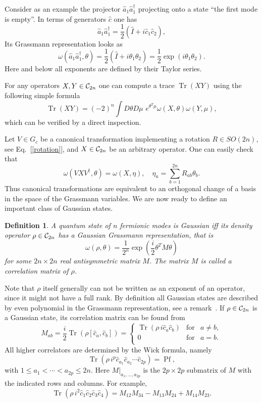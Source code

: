 \documentclass[twocolumn,showpacs,preprintnumbers,superscriptaddress]{revtex4}
\newtheorem{dfn}{Definition}
\newcommand{\Clif}{{\cal C}}
\newcommand{\be}{\begin{equation}}
\newcommand{\ee}{\end{equation}}
\newcommand{\ba}{\begin{array}}
\newcommand{\ea}{\end{array}}
\newcommand{\Pf}[1]{\mathop{\mathrm{Pf}(#1)}}
\newcommand{\aop}{{\hat{a}}}
\newcommand{\cop}{{\hat{c}}}
\newcommand{\Iop}{{\hat{I}}}
\DeclareMathOperator*{\tr}{\mathop{\mathrm{Tr}}}
\begin{document}
Consider as an example the projector $\aop_1 \aop_1^\dag$
projecting onto a state ``the first mode is empty''. In terms
of generators $\cop$ one has
\[
\aop_1 \aop_1^\dag = \frac12\left( \Iop + i\cop_1\cop_2\right),
\]
Its Grassmann representation looks as
\be\label{Grassmann_Proj}
\omega(\aop_1 \aop_1^\dag,\theta)=
\frac12\left( \Iop + i\theta_1\theta_2\right) =
\frac12 \exp{ \left(  i \theta_1\theta_2 \right) }.
\ee
Here and below all exponents are defined by their Taylor series.

For any operators $X,Y\in \Clif_{2n}$  one can compute a trace
$\tr(XY)$ using the following simple formula
\be\label{trace}
\tr(X Y) = {(-2)}^n\int D\theta D\mu\,\, e^{\theta^T \mu} 
\omega(X,\theta) \omega(Y,\mu),
\ee
which can be verified by a direct inspection.

Let $V\in G_c$ be a canonical transformation implementing a rotation
$R\in SO(2n)$, see Eq.~[\ref{rotation}], and 
$X\in \Clif_{2n}$ be an
arbitrary operator. One can easily check that
\be\label{ortogonal}
\omega(VXV^\dag,\theta) = \omega(X,\eta),
\quad
\eta_a = \sum_{b=1}^{2n}R_{ab}\theta_b.
\ee
Thus canonical transformations are equivalent to an
orthogonal change of a basis in the space of the Grassmann variables.
We are now ready to define an important class of Gaussian states.
\begin{dfn}\label{def:GS}
A quantum state of $n$ fermionic modes is Gaussian  iff its 
density operator $\rho\in \Clif_{2n}$ has a Gaussian Grassmann
representation, that is
\[
\omega(\rho,\theta)=\frac1{2^n}\exp{\left( 
\frac{i}2 \theta^T M \theta \right)}
\]
for some $2n\times 2n$ real antisymmetric matrix $M$.
The matrix $M$ is called a correlation matrix of $\rho$.
\end{dfn}
Note that $\rho$ itself generally can not be written as an exponent of an
operator, since  it might not have a full rank. By definition
all Gaussian states are described by even polynomial in the Grassmann 
representation, see a remark~\cite{comment}. 
If $\rho\in \Clif_{2n}$ is a Gaussian state, its correlation matrix
can be found from
\[
M_{ab}=\frac{i}2 \tr{\left( \rho [\cop_a,\cop_b] \right)}=
\left\{ \ba{rcl} \tr{\left( \rho\, i\cop_a\cop_b \right)} &\mbox{for}& a\ne b,\\
            0 &\mbox{for}& a=b. \\ \ea \right.
\]
All higher correlators are determined by the Wick formula, namely
\be\label{Wick}
\tr{(\rho\, i^p \cop_{a_1}\cop_{a_2}\cdots \cop_{2p})}=
\Pf{\left. M \right|_{a_1,\ldots, a_{2p}}},
\ee
with  $1\le a_1<\cdots<a_{2p}\le 2n$.  Here $\left. M \right|_{a_1,\ldots, a_{2p}}$ 
is the  $2p\times 2p$ submatrix of $M$ with the indicated rows and columns.
For example,
\[
\tr{(\rho\, i^2 \cop_{1}\cop_{2} \cop_3 \cop_4)}= M_{12} M_{34} - M_{13} M_{24} + 
M_{14} M_{23}.
\]
\end{document}
